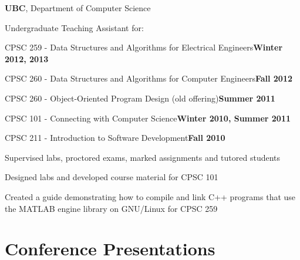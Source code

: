\documentclass[margin,line]{res}
\newenvironment{list1}{
  \begin{list}{\ding{113}}{
      \setlength{\itemsep}{0in}
      \setlength{\parsep}{0in} \setlength{\parskip}{0in}
      \setlength{\topsep}{0in} \setlength{\partopsep}{0in} 
      \setlength{\leftmargin}{0.17in}}}{\end{list}}
\newenvironment{list3}{
  \begin{list}{\textopenbullet}{
      \setlength{\itemsep}{0in}
      \setlength{\parsep}{0in} \setlength{\parskip}{0in}
      \setlength{\topsep}{0in} \setlength{\partopsep}{0in} 
      \setlength{\leftmargin}{0.1in}}}{\end{list}}
\begin{document}
\begin{resume}
{\bf  UBC}, Department of Computer Science\\
\vspace*{-.2cm}
\begin{list1}
\item[] Undergraduate Teaching Assistant for:\\[-0.1cm]
\item[] CPSC 259 - Data Structures and Algorithms for Electrical Engineers\hfill{\bf Winter 2012, 2013}
\item[] CPSC 260 - Data Structures and Algorithms for Computer Engineers\hfill{\bf Fall 2012}
\item[] CPSC 260 - Object-Oriented Program Design (old offering)\hfill{\bf Summer 2011}
\item[] CPSC 101 - Connecting with Computer Science\hfill{\bf Winter 2010, Summer 2011}
\item[] CPSC 211 - Introduction to Software Development\hfill{\bf Fall 2010}\\
\begin{list3}
\vspace*{-.1cm}
\item Supervised labs, proctored exams, marked assignments and tutored students
\item Designed labs and developed course material for CPSC 101
\item Created a guide demonstrating how to compile and link C++ programs that use the MATLAB engine library on GNU/Linux for CPSC 259
\end{list3}
\end{list1}

\vspace*{.1cm}

\section{\sc Conference Presentations}


\end{resume}
\end{document}
